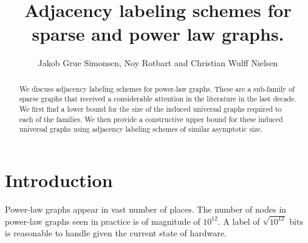 \documentclass{article}
\title{Adjacency labeling  schemes for sparse and power law graphs.}
\author{Jakob Grue Simonsen, Noy Rotbart and Christian Wulff Nielsen}
\theoremstyle{remark}
\begin{document}
\maketitle
\begin{abstract}
We discuss adjacency labeling schemes for power-law graphs. These are a sub-family of sparse graphs that  received a considerable attention in the literature in the last decade. We first find a lower bound for the size of the induced universal graphs required to each of the families.
We then  provide a constructive upper bound for these induced universal graphs using adjacency  labeling schemes of similar asymptotic size.
\end{abstract}
\section{Introduction}
Power-law graphs appear in vast number of places.
The number of nodes in power-law graphs seen in practice is of magnitude  of $10^{12}$.
A label of  $\sqrt{10^{12}}$ bits is reasonable to handle given the current state of hardware. 
\end{document}
